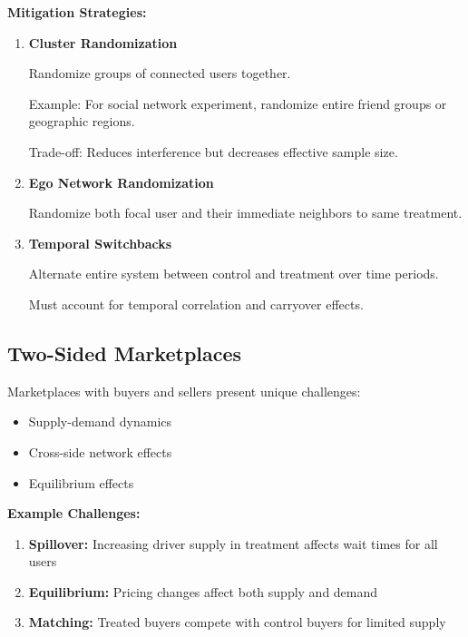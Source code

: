 \textbf{Mitigation Strategies:}

\begin{enumerate}
    \item \textbf{Cluster Randomization}

    Randomize groups of connected users together.

    Example: For social network experiment, randomize entire friend groups or geographic regions.

    Trade-off: Reduces interference but decreases effective sample size.

    \item \textbf{Ego Network Randomization}

    Randomize both focal user and their immediate neighbors to same treatment.

    \item \textbf{Temporal Switchbacks}

    Alternate entire system between control and treatment over time periods.

    Must account for temporal correlation and carryover effects.
\end{enumerate}

\subsection{Two-Sided Marketplaces}

Marketplaces with buyers and sellers present unique challenges:
\begin{itemize}
    \item Supply-demand dynamics
    \item Cross-side network effects
    \item Equilibrium effects
\end{itemize}

\textbf{Example Challenges:}

\begin{enumerate}
    \item \textbf{Spillover:} Increasing driver supply in treatment affects wait times for all users

    \item \textbf{Equilibrium:} Pricing changes affect both supply and demand

    \item \textbf{Matching:} Treated buyers compete with control buyers for limited supply
\end{enumerate}

